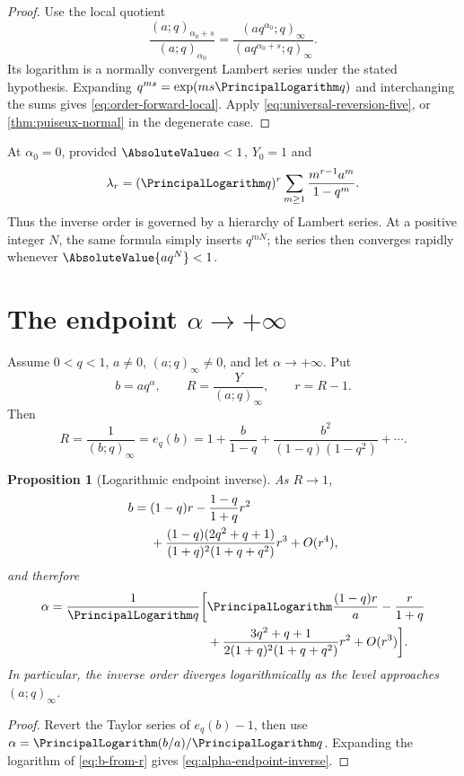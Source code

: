 \documentclass[11pt,a4paper,oneside,openany]{book}
\newtheorem{proposition}[theorem]{Proposition}
\theoremstyle{definition}
\theoremstyle{remark}
\begin{document}
\begin{proof}
Use the local quotient
\[
 \frac{(a;q)_{\alpha_0+s}}{(a;q)_{\alpha_0}}
 =\frac{(a q^{\alpha_0};q)_\infty}
 {(a q^{\alpha_0+s};q)_\infty}.
\]
Its logarithm is a normally convergent Lambert series under the stated
hypothesis.  Expanding \(q^{ms}=\exp(ms\PrincipalLogarithm q)\) and interchanging the
sums gives \eqref{eq:order-forward-local}.  Apply
\eqref{eq:universal-reversion-five}, or
\cref{thm:puiseux-normal} in the degenerate case.
\end{proof}

At \(\alpha_0=0\), provided \(\AbsoluteValue a<1\), \(Y_0=1\) and
\[
 \lambda_r=(\PrincipalLogarithm q)^r\sum_{m\ge1}\frac{m^{r-1}a^m}{1-q^m}.
\]
Thus the inverse order is governed by a hierarchy of Lambert series.  At a
positive integer \(N\), the same formula simply inserts \(q^{mN}\); the
series then converges rapidly whenever \(\AbsoluteValue{a q^N}<1\).

\section{The endpoint \texorpdfstring{$\alpha\to+\infty$}{alpha to infinity}}

Assume \(0<q<1\), \(a\ne0\), \((a;q)_\infty\ne0\), and let
\(\alpha\to+\infty\).  Put
\[
 b=aq^\alpha,
 \qquad R=\frac{Y}{(a;q)_\infty},
 \qquad r=R-1.
\]
Then
\[
 R=\frac1{(b;q)_\infty}=e_q(b)
 =1+\frac{b}{1-q}+\frac{b^2}{(1-q)(1-q^2)}+\cdots.
\]

\begin{proposition}[Logarithmic endpoint inverse]\label{prop:order-endpoint}
As \(R\to1\),
\begin{align}
 b={}&(1-q)r-\frac{1-q}{1+q}r^2\notag\\
 &+\frac{(1-q)(2q^2+q+1)}{(1+q)^2(1+q+q^2)}r^3+O(r^4),
\label{eq:b-from-r}
\end{align}
and therefore
\begin{align}
 \alpha=\frac1{\PrincipalLogarithm q}\bigg[&\PrincipalLogarithm\frac{(1-q)r}{a}
 -\frac{r}{1+q}\notag\\
 &+\frac{3q^2+q+1}{2(1+q)^2(1+q+q^2)}r^2+O(r^3)\bigg].
\label{eq:alpha-endpoint-inverse}
\end{align}
In particular, the inverse order diverges logarithmically as the level
approaches \((a;q)_\infty\).
\end{proposition}

\begin{proof}
Revert the Taylor series of \(e_q(b)-1\), then use
\(\alpha=\PrincipalLogarithm(b/a)/\PrincipalLogarithm q\).  Expanding the logarithm of
\eqref{eq:b-from-r} gives \eqref{eq:alpha-endpoint-inverse}.
\end{proof}
\end{document}
